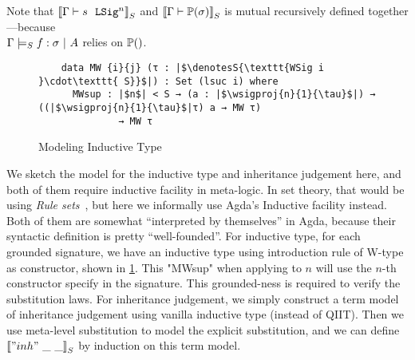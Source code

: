 
Note that $\denotesS{\goodSig{\Gm}{s}{n}}$ and $\denotesS{\goodType{\Gm}{\TyTkg{\sigma}}{i}}$ is mutual recursively defined together---because \\ $\goodSealS{\Gm}{f}{\sigma}{A}$ relies on $\TyTkg{}$. 

\begin{figure}[!htb]
  \centering
\begin{minipage}{0.8\linewidth}
  \begin{verbatim}
    data MW {i}{j} (τ : |$\denotesS{\texttt{WSig i }\cdot\texttt{ S}}$|) : Set (lsuc i) where
      MWsup : |$n$| < S → (a : |$\wsigproj{n}{1}{\tau}$|) → ((|$\wsigproj{n}{1}{\tau}$|τ) a → MW τ) 
              → MW τ
      \end{verbatim}
\end{minipage}
\caption{Modeling Inductive Type}\label{fig:model-ind-type}
\end{figure}

We sketch the model for the inductive type and inheritance judgement here, and both of them require inductive facility in meta-logic. In set theory, that would be using \textit{Rule sets}~\cite{timany2017consistency,aczel1998relating}, but here we informally use Agda's Inductive facility instead. Both of them are somewhat ``interpreted by themselves'' in Agda, because their syntactic definition is pretty ``well-founded''. For inductive type, for each grounded signature, we have an inductive type using introduction rule of W-type as constructor, shown in \cref{fig:model-ind-type}. This "MWsup" when applying to $n$ will use the $n$-th constructor specify in the signature. This grounded-ness is required to verify the substitution laws. For inheritance judgement, we simply construct a term model of inheritance judgement using vanilla inductive type (instead of QIIT). Then we use meta-level substitution to model the explicit substitution, and we can define $\denotesS{"inh"~\_ ~\_}$ by induction on this term model. 



